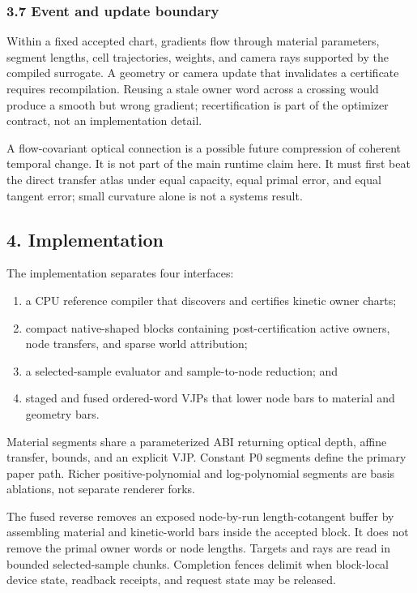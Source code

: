 \documentclass[
]{article}
\providecommand{\tightlist}{%
  \setlength{\itemsep}{0pt}\setlength{\parskip}{0pt}}
\begin{document}
\subsubsection{3.7 Event and update
boundary}\label{event-and-update-boundary}

Within a fixed accepted chart, gradients flow through material
parameters, segment lengths, cell trajectories, weights, and camera rays
supported by the compiled surrogate. A geometry or camera update that
invalidates a certificate requires recompilation. Reusing a stale owner
word across a crossing would produce a smooth but wrong gradient;
recertification is part of the optimizer contract, not an implementation
detail.

A flow-covariant optical connection is a possible future compression of
coherent temporal change. It is not part of the main runtime claim here.
It must first beat the direct transfer atlas under equal capacity, equal
primal error, and equal tangent error; small curvature alone is not a
systems result.

\subsection{4. Implementation}\label{implementation}

The implementation separates four interfaces:

\begin{enumerate}
\def\labelenumi{\arabic{enumi}.}
\tightlist
\item
  a CPU reference compiler that discovers and certifies kinetic owner
  charts;
\item
  compact native-shaped blocks containing post-certification active
  owners, node transfers, and sparse world attribution;
\item
  a selected-sample evaluator and sample-to-node reduction; and
\item
  staged and fused ordered-word VJPs that lower node bars to material
  and geometry bars.
\end{enumerate}

Material segments share a parameterized ABI returning optical depth,
affine transfer, bounds, and an explicit VJP. Constant P0 segments
define the primary paper path. Richer positive-polynomial and
log-polynomial segments are basis ablations, not separate renderer
forks.

The fused reverse removes an exposed node-by-run length-cotangent buffer
by assembling material and kinetic-world bars inside the accepted block.
It does not remove the primal owner words or node lengths. Targets and
rays are read in bounded selected-sample chunks. Completion fences
delimit when block-local device state, readback receipts, and request
state may be released.
\end{document}
